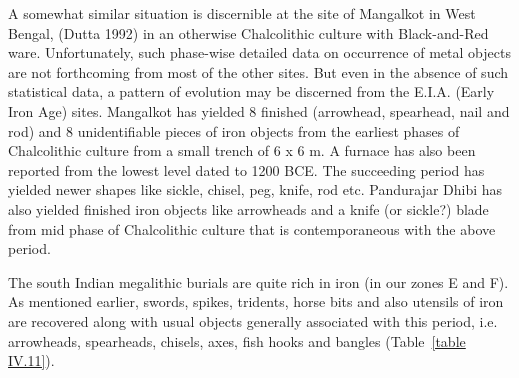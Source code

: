 A somewhat similar situation is discernible at the site of Mangalkot in West Bengal, (Dutta 1992) in an otherwise Chalcolithic culture with Black-and-Red ware. Unfortunately, such phase-wise detailed data on occurrence of metal objects are not forthcoming from most of the other sites. But even in the absence of such statistical data, a pattern of evolution may be discerned from the E.I.A. (Early Iron Age) sites. Mangalkot has yielded 8 finished (arrowhead, spearhead, nail and rod) and 8 unidentifiable pieces of iron objects from the earliest phases of Chalcolithic culture from a small trench of 6 x 6 m. A furnace has also been reported from the lowest level dated to 1200 BCE. The succeeding period has yielded newer shapes like sickle, chisel, peg, knife, rod etc. Pandurajar Dhibi has also yielded finished iron objects like arrowheads and a knife (or sickle?) blade from mid phase of Chalcolithic culture that is contemporaneous with the above period.

The south Indian megalithic burials are quite rich in iron (in our zones E and F). As mentioned earlier, swords, spikes, tridents, horse bits and also utensils of iron are recovered along with usual objects generally associated with this period, i.e. arrowheads, spearheads, chisels, axes, fish hooks and bangles (Table~\ref{table IV.11}).

